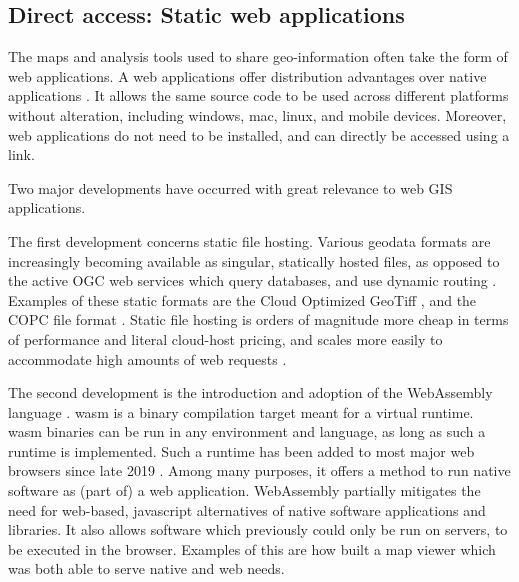 \subsection*{Direct access: Static web applications}

The maps and analysis tools used to share geo-information often take the form of web applications.  
A web applications offer distribution advantages over native applications \citep{kuhail_characterizing_2021, panidi_hybrid_2015}. 
It allows the same source code to be used across different platforms without alteration, including windows, mac, linux, and mobile devices. 
Moreover, web applications do not need to be installed, and can directly be accessed using a link. 

Two major developments have occurred with great relevance to web GIS applications.

The first development concerns static file hosting.
Various geodata formats are increasingly becoming available as singular, statically hosted files, 
as opposed to the active \ac{OGC} web services which query databases, and use dynamic routing \citep{open_geospatial_consortium_web_2015}.
Examples of these static formats are the Cloud Optimized GeoTiff \citep{sarago_cloud_2021}, and the COPC file format \citep{bell_cloud_2021}. 
Static file hosting is orders of magnitude more cheap in terms of performance and literal cloud-host pricing, and scales more easily to accommodate high amounts of web requests \citep{sarago_cloud_2021}.

The second development is the introduction and adoption of the WebAssembly language \citep{haas_bringing_2017}. 
\ac{wasm} is a binary compilation target meant for a virtual runtime. 
\ac{wasm} binaries can be run in any environment and language, as long as such a runtime is implemented. 
Such a runtime has been added to most major web browsers since late 2019 \citep{w3c_world_2019}. 
Among many purposes, it offers a method to run native software as (part of) a web application. 
WebAssembly partially mitigates the need for web-based, javascript alternatives of native software applications and libraries. 
It also allows software which previously could only be run on servers, to be executed in the browser. 
Examples of this are how \citet{ammann_maplibre-rs_2022} built a map viewer which was both able to serve native and web needs.


